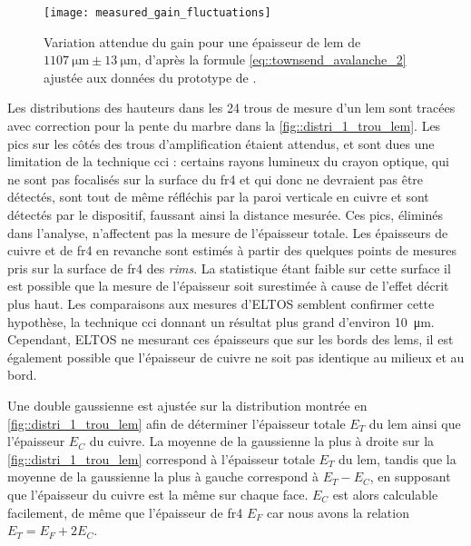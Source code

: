         \begin{figure}[!htb]
          \centering
          \texttt{[image: measured\_gain\_fluctuations]}
          \caption[Variation attendues du gain pour l'épaisseur moyennes des LEMs mesurés]{\label{fig::exp_gain_range}Variation attendue du gain pour une épaisseur de \gls{lem} de $\SI{1107}{\micro\meter}\pm\SI{13}{\micro\meter}$, d'après la formule \eqref{eq::townsend_avalanche_2} ajustée aux données du prototype de \threeL{}\cite{Cantini2014}.}
        \end{figure}
                
        Les distributions des hauteurs dans les 24 trous de mesure d'un \gls{lem} sont tracées avec correction pour la pente du marbre dans la \autoref{fig::distri_1_trou_lem}. Les pics sur les côtés des trous d'amplification étaient attendus, et sont dues une limitation de la technique \gls{cci} : certains rayons lumineux du crayon optique, qui ne sont pas focalisés sur la surface du \gls{fr4} et qui donc ne devraient pas être détectés, sont tout de même réfléchis par la paroi verticale en cuivre et sont détectés par le dispositif, faussant ainsi la distance mesurée. Ces pics, éliminés dans l'analyse, n'affectent pas la mesure de l'épaisseur totale. Les épaisseurs de cuivre et de \gls{fr4} en revanche sont estimés à partir des quelques points de mesures pris sur la surface de \gls{fr4} des \textit{rims}. La statistique étant faible sur cette surface il est possible que la mesure de l'épaisseur soit surestimée à cause de l'effet décrit plus haut. Les comparaisons aux mesures d'ELTOS semblent confirmer cette hypothèse, la technique \gls{cci} donnant un résultat plus grand d'environ \SI{10}{\micro\meter}. Cependant, ELTOS ne mesurant ces épaisseurs que sur les bords des \glspl{lem}, il est également possible que l'épaisseur de cuivre ne soit pas identique au milieux et au bord.
                
        Une double gaussienne est ajustée sur la distribution montrée en \autoref{fig::distri_1_trou_lem} afin de déterminer l'épaisseur totale $E_T$ du \gls{lem} ainsi que l'épaisseur $E_C$ du cuivre. La moyenne de la gaussienne la plus à droite sur la \autoref{fig::distri_1_trou_lem} correspond à l'épaisseur totale $E_T$ du \gls{lem}, tandis que la moyenne de la gaussienne la plus à gauche correspond à $E_T - E_C$, en supposant que l'épaisseur du cuivre est la même sur chaque face. $E_C$ est alors calculable facilement, de même que l'épaisseur de \gls{fr4} $E_F$ car nous avons la relation $E_T = E_F + 2E_C$.
                
